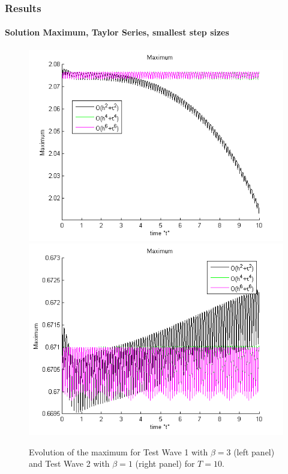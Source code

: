 \documentclass{beamer}
\begin{document}
\begin{frame}
\frametitle{Results}
\framesubtitle{Solution Maximum, Taylor Series, smallest step sizes}

\begin{figure}[ht]
	\centering
	\begin{minipage}[b]{0.4\linewidth}
		\includegraphics[width=\linewidth]{figures/maximum_30_bt3_c045_h005.png}
	\end{minipage}	
	\begin{minipage}[b]{0.4\linewidth}
		 \includegraphics[width=\linewidth]{figures/maximum_128_bt1_c090_h010.png}
	\end{minipage}

Evolution of the maximum for Test Wave 1 with $\beta =3$ (left panel) and Test Wave 2 with $\beta=1$ (right panel) for $T=10$.
\end{figure}

\end{frame}
\end{document}
